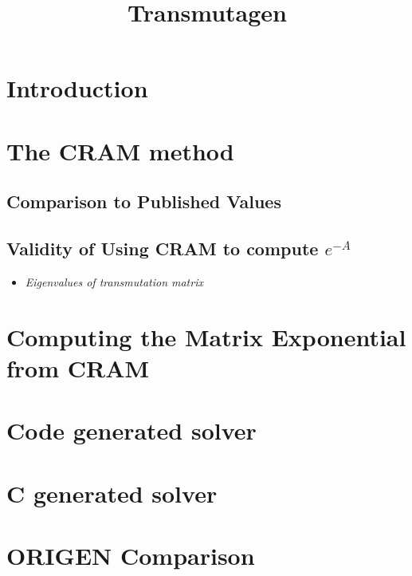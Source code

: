 \documentclass{article}
\title{Transmutagen}
\begin{document}
\flushbottom
\maketitle
\thispagestyle{empty}

\begin{abstract}

\end{abstract}


\section{Introduction}

\section{The CRAM method}
\label{sec:cram-method}


\subsection{Comparison to Published Values}
\subsection{Validity of Using CRAM to compute $e^{-A}$}
\begin{itemize}
\item \it{Eigenvalues of transmutation matrix}
\end{itemize}

\section{Computing the Matrix Exponential from CRAM}
\label{sec:matrix-cram}


\section{Code generated solver}
\label{sec:lambdify-solve}


\section{C generated solver}
\label{sec:c-solve}


\section{ORIGEN Comparison}
\end{document}
